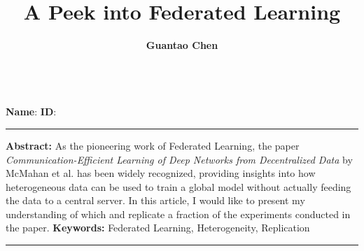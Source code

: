 \documentclass[a4paper,12pt]{article}
\title{A Peek into Federated Learning}
\author{\textbf{Guantao Chen}\hspace{1cm}}
\makeatletter
\renewcommand\maketitle{
{\raggedright
\vspace*{12pt}
\begin{center}
{\fontsize{20pt}{20pt}\selectfont \bfseries \@title }\\[1.5em]
  \textbf{Name}: \@author \quad \textbf{ID}: \defstunum \\
\end{center}}
}
\makeatother
\begin{document}
\maketitle

\noindent\rule[0.1\baselineskip]{\textwidth}{0.5pt}
\textbf{Abstract:}
As the pioneering work of Federated Learning, the paper \textit{Communication-Efficient Learning of Deep Networks from Decentralized Data} 
by McMahan et al. has been widely recognized, providing insights into how heterogeneous data can be used to train a global model without actually feeding the data to a central server.
In this article, I would like to present my understanding of which and replicate a fraction of the experiments conducted in the paper.
\vskip 3pt
\noindent \textbf{Keywords:} Federated Learning, Heterogeneity, Replication\\
\rule[0.3\baselineskip]{\textwidth}{0.5pt}
\vskip 10pt





\end{document}
